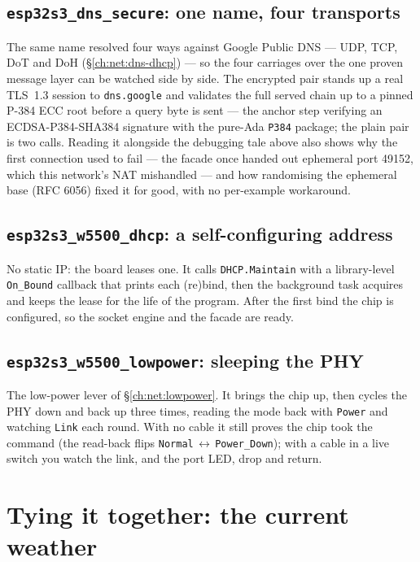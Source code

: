 \subsection{\texttt{esp32s3\_dns\_secure}: one name, four transports}

The same name resolved four ways against Google Public DNS --- UDP, TCP, DoT
and DoH (\S\ref{ch:net:dns-dhcp}) --- so the four carriages over the one proven
message layer can be watched side by side. The encrypted pair stands up a real
TLS~1.3 session to \texttt{dns.google} and validates the full served chain up
to a pinned P-384 ECC root before a query byte is sent --- the anchor step
verifying an ECDSA-P384-SHA384 signature with the pure-Ada \texttt{P384}
package; the plain pair is two calls.
Reading it alongside the debugging tale above also shows why the first
connection used to fail --- the facade once handed out ephemeral port 49152,
which this network's NAT mishandled --- and how randomising the ephemeral base
(RFC 6056) fixed it for good, with no per-example workaround.

\subsection{\texttt{esp32s3\_w5500\_dhcp}: a self-configuring address}

No static IP: the board leases one. It calls \texttt{DHCP.Maintain} with a
library-level \texttt{On\_Bound} callback that prints each (re)bind, then the
background task acquires and keeps the lease for the life of the program. After the
first bind the chip is configured, so the socket engine and the facade are ready.

\subsection{\texttt{esp32s3\_w5500\_lowpower}: sleeping the PHY}

The low-power lever of \S\ref{ch:net:lowpower}. It brings the chip up, then cycles
the PHY down and back up three times, reading the mode back with \texttt{Power} and
watching \texttt{Link} each round. With no cable it still proves the chip took the
command (the read-back flips \texttt{Normal}\,$\leftrightarrow$\,\texttt{Power\_Down});
with a cable in a live switch you watch the link, and the port LED, drop and return.

\section{Tying it together: the current weather}
\label{ch:net:weather}

